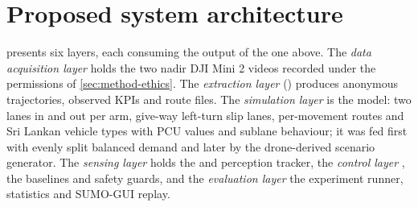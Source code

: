 \section{Proposed system architecture}\label{sec:srs-arch}

 presents six layers, each consuming the output of the one above. The \emph{data acquisition layer} holds the two nadir DJI Mini 2 videos recorded under the permissions of \cref{sec:method-ethics}. The \emph{extraction layer} (\dtx{}) produces anonymous trajectories, observed KPIs and route files. The \emph{simulation layer} is the \sumo{} model: two lanes in and out per arm, give-way left-turn slip lanes, per-movement routes and Sri Lankan vehicle types with PCU values and sublane behaviour; it was fed first with evenly split balanced demand and later by the drone-derived scenario generator. The \emph{sensing layer} holds the \vls{} and perception tracker, the \emph{control layer} \prism{}, the baselines and safety guards, and the \emph{evaluation layer} the experiment runner, statistics and SUMO-GUI replay.


